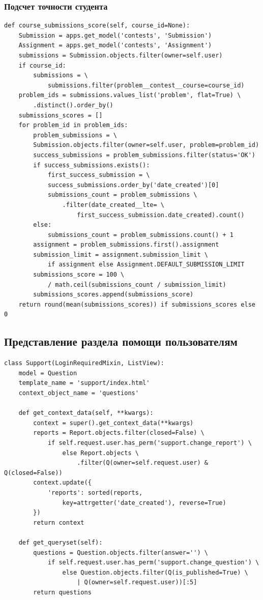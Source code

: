 \documentclass[12pt, a4paper, oneside]{article}
\begin{document}
\subsubsection{Подсчет точности студента}
\begin{verbatim}
def course_submissions_score(self, course_id=None):
    Submission = apps.get_model('contests', 'Submission')
    Assignment = apps.get_model('contests', 'Assignment')
    submissions = Submission.objects.filter(owner=self.user)
    if course_id:
        submissions = \
            submissions.filter(problem__contest__course=course_id)
    problem_ids = submissions.values_list('problem', flat=True) \
        .distinct().order_by()
    submissions_scores = []
    for problem_id in problem_ids:
        problem_submissions = \ 
        Submission.objects.filter(owner=self.user, problem=problem_id)
        success_submissions = problem_submissions.filter(status='OK')
        if success_submissions.exists():
            first_success_submission = \ 
            success_submissions.order_by('date_created')[0]
            submissions_count = problem_submissions \
                .filter(date_created__lte= \
                    first_success_submission.date_created).count()
        else:
            submissions_count = problem_submissions.count() + 1
        assignment = problem_submissions.first().assignment
        submission_limit = assignment.submission_limit \
            if assignment else Assignment.DEFAULT_SUBMISSION_LIMIT
        submissions_score = 100 \
            / math.ceil(submissions_count / submission_limit)
        submissions_scores.append(submissions_score)
    return round(mean(submissions_scores)) if submissions_scores else 0
\end{verbatim}
\subsection{Представление раздела помощи пользователям}
\begin{verbatim}
class Support(LoginRequiredMixin, ListView):
    model = Question
    template_name = 'support/index.html'
    context_object_name = 'questions'

    def get_context_data(self, **kwargs):
        context = super().get_context_data(**kwargs)
        reports = Report.objects.filter(closed=False) \
            if self.request.user.has_perm('support.change_report') \
                else Report.objects \
                    .filter(Q(owner=self.request.user) & Q(closed=False))
        context.update({
            'reports': sorted(reports, 
                key=attrgetter('date_created'), reverse=True)
        })
        return context

    def get_queryset(self):
        questions = Question.objects.filter(answer='') \
            if self.request.user.has_perm('support.change_question') \
                else Question.objects.filter(Q(is_published=True) \
                    | Q(owner=self.request.user))[:5]
        return questions
\end{verbatim}
\newpage
\end{document}

